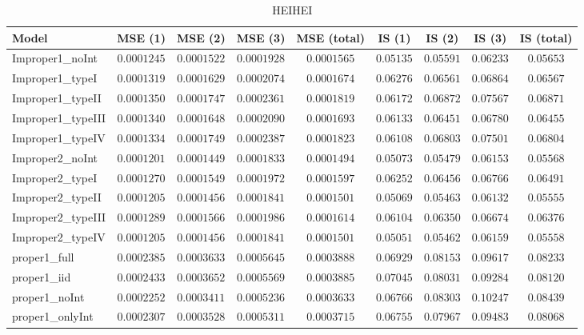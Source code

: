 \begin{table}

\caption{\label{tab:model-choice-sc11}HEIHEI}
\centering
\begin{tabular}{lcccccccc}
\hline
Model  & MSE (1) & MSE (2) & MSE (3) & MSE (total) & IS (1) & IS (2) & IS (3) & \multicolumn{1}{c}{IS (total)} \\ 
\hline
Improper1_noInt  & $0.0001245$ & $0.0001522$ & $0.0001928$ & $0.0001565$ & $0.05135$ & $0.05591$ & $0.06233$ & $0.05653$ \\
Improper1_typeI  & $0.0001319$ & $0.0001629$ & $0.0002074$ & $0.0001674$ & $0.06276$ & $0.06561$ & $0.06864$ & $0.06567$ \\
Improper1_typeII  & $0.0001350$ & $0.0001747$ & $0.0002361$ & $0.0001819$ & $0.06172$ & $0.06872$ & $0.07567$ & $0.06871$ \\
Improper1_typeIII  & $0.0001340$ & $0.0001648$ & $0.0002090$ & $0.0001693$ & $0.06133$ & $0.06451$ & $0.06780$ & $0.06455$ \\
Improper1_typeIV  & $0.0001334$ & $0.0001749$ & $0.0002387$ & $0.0001823$ & $0.06108$ & $0.06803$ & $0.07501$ & $0.06804$ \\
Improper2_noInt  & $0.0001201$ & $0.0001449$ & $0.0001833$ & $0.0001494$ & $0.05073$ & $0.05479$ & $0.06153$ & $0.05568$ \\
Improper2_typeI  & $0.0001270$ & $0.0001549$ & $0.0001972$ & $0.0001597$ & $0.06252$ & $0.06456$ & $0.06766$ & $0.06491$ \\
Improper2_typeII  & $0.0001205$ & $0.0001456$ & $0.0001841$ & $0.0001501$ & $0.05069$ & $0.05463$ & $0.06132$ & $0.05555$ \\
Improper2_typeIII  & $0.0001289$ & $0.0001566$ & $0.0001986$ & $0.0001614$ & $0.06104$ & $0.06350$ & $0.06674$ & $0.06376$ \\
Improper2_typeIV  & $0.0001205$ & $0.0001456$ & $0.0001841$ & $0.0001501$ & $0.05051$ & $0.05462$ & $0.06159$ & $0.05558$ \\
proper1_full  & $0.0002385$ & $0.0003633$ & $0.0005645$ & $0.0003888$ & $0.06929$ & $0.08153$ & $0.09617$ & $0.08233$ \\
proper1_iid  & $0.0002433$ & $0.0003652$ & $0.0005569$ & $0.0003885$ & $0.07045$ & $0.08031$ & $0.09284$ & $0.08120$ \\
proper1_noInt  & $0.0002252$ & $0.0003411$ & $0.0005236$ & $0.0003633$ & $0.06766$ & $0.08303$ & $0.10247$ & $0.08439$ \\
proper1_onlyInt  & $0.0002307$ & $0.0003528$ & $0.0005311$ & $0.0003715$ & $0.06755$ & $0.07967$ & $0.09483$ & $0.08068$ \\

\end{tabular}
\end{table}
